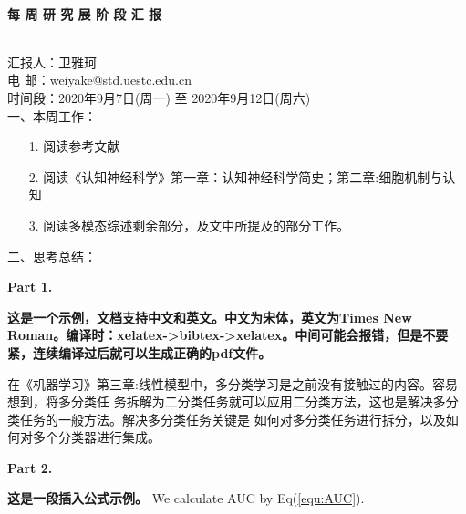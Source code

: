 \documentclass[UTF8,10.5pt]{article} %
\begin{document}
~\\
\centerline{ \large \bf{每} \hspace{0.07cm} \bf{周}\hspace{0.07cm} \bf{研} \hspace{0.07cm}\bf{究} \hspace{0.07cm}\bf{展} \hspace{0.07cm}\bf{阶}\hspace{0.07cm} \bf{段}\hspace{0.07cm} \bf{汇} \hspace{0.07cm}\bf{报}}
~\\

\noindent 汇报人：卫雅珂 \\
\noindent 电\hspace{0.29cm} 邮：weiyake@std.uestc.edu.cn \\
\noindent 时间段：2020年9月7日(周一) 至 2020年9月12日(周六) \\

\noindent 一、本周工作：

\begin{enumerate}[labelsep = .5em, leftmargin = -18pt, itemindent = 3em]
    \item [1.] 阅读参考文献\cite{tian2021unsupervised,NEURIPS2020_7288251b,gao2018learning,uijlings2013selective,cinbis2016weakly}
    \item [2.] 阅读《认知神经科学》第一章：认知神经科学简史；第二章:细胞机制与认知
    \item [3.] 阅读多模态综述剩余部分，及文中所提及的部分工作。
\end{enumerate}
\vspace{0.3cm}

\noindent 二、思考总结：

\noindent \textbf{Part 1.} 

\textbf{这是一个示例，文档支持中文和英文。中文为宋体，英文为Times New Roman。编译时：xelatex->bibtex->xelatex。中间可能会报错，但是不要紧，连续编译过后就可以生成正确的pdf文件。}

在《机器学习》第三章:线性模型中，多分类学习是之前没有接触过的内容。容易想到，将多分类任 务拆解为二分类任务就可以应用二分类方法，这也是解决多分类任务的一般方法。解决多分类任务关键是 如何对多分类任务进行拆分，以及如何对多个分类器进行集成。


\vspace{0.5cm}
\noindent \textbf{Part 2.} 

\textbf{这是一段插入公式示例。}
We calculate AUC by Eq(\ref{equ:AUC}).
\end{document}
